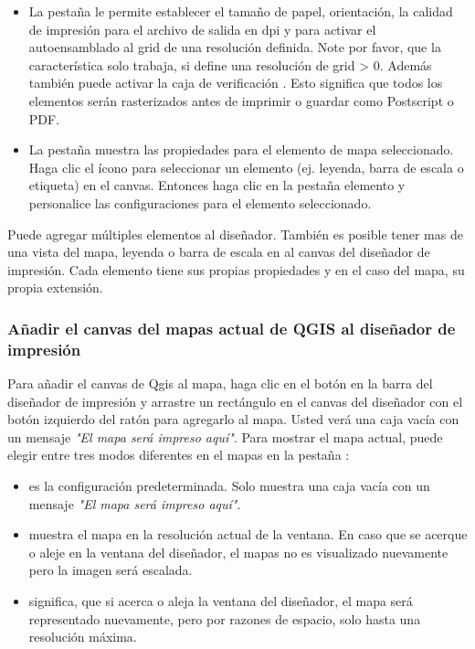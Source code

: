 \begin{itemize}
\item La pestaña  le permite establecer el tamaño de papel, orientación, la
calidad de impresión para el archivo de salida en dpi y para activar el autoensamblado al grid
de una resolución definida. Note por favor, que la característica 
solo trabaja, si define una resolución de grid > 0. Además también puede
activar la caja de verificación . Esto significa que todos los elementos
serán rasterizados antes de imprimir o guardar como Postscript o PDF.
\item La pestaña  muestra las propiedades para el elemento de mapa seleccionado. 
Haga clic el ícono  
para seleccionar un elemento (ej. leyenda, barra de escala o etiqueta) en el canvas. 
Entonces haga clic en la pestaña elemento y personalice las configuraciones para el elemento seleccionado.
\end{itemize}

Puede agregar múltiples elementos al diseñador. También es posible tener 
mas de una vista del mapa, leyenda o barra de escala en al canvas del diseñador de impresión. 
Cada elemento tiene sus propias propiedades y en el caso del mapa, su propia 
extensión.

\subsubsection{Añadir el canvas del mapas actual de QGIS al diseñador de impresión}

Para añadir el canvas de Qgis al mapa, haga clic en el botón  en la barra del diseñador de impresión y arrastre un 
rectángulo en el canvas del diseñador con el botón izquierdo del ratón para agregarlo al mapa. 
Usted verá una caja vacía con un mensaje \textit{"El mapa será impreso aquí"}.
Para mostrar el mapa actual, puede elegir entre tres modos diferentes en el mapas en la pestaña :

\begin{itemize}
\item {} es la configuración predeterminada. Solo muestra
una caja vacía con un mensaje \textit{"El mapa será impreso aquí"}. 
\item {} muestra el mapa en la resolución actual de la ventana. En caso que se acerque o aleje en la ventana del diseñador, el mapas no es visualizado nuevamente
pero la imagen será escalada.
\item {} significa, que si acerca o aleja la 
ventana del diseñador, el mapa será representado nuevamente, pero por razones de espacio, solo
hasta una resolución máxima.
\end{itemize}

